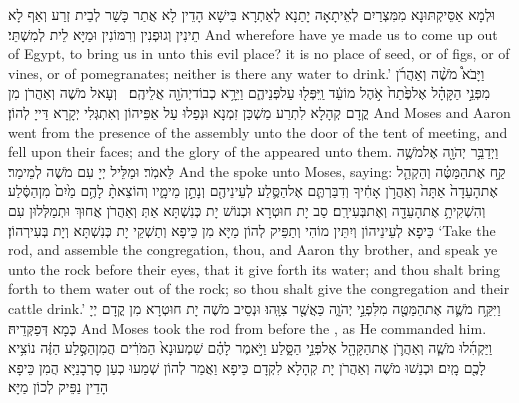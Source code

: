 {וּלְמָא אַסֵּיקְתּוּנָא מִמִּצְרַיִם לְאֵיתָאָה יָתַנָא לְאַתְרָא בִּישָׁא הָדֵין לָא אֲתַר כָּשַׁר לְבֵית זְרַע וְאַף לָא תֵינִין וְגוּפְנִין וְרִמּוֹנִין וּמַיָּא לֵית לְמִשְׁתֵּי׃}
{And wherefore have ye made us to come up out of Egypt, to bring us in unto this evil place? it is no place of seed, or of figs, or of vines, or of pomegranates; neither is there any water to drink.’}{}
{וַיָּבֹא֩ מֹשֶׁ֨ה וְאַהֲרֹ֜ן מִפְּנֵ֣י הַקָּהָ֗ל אֶל\maqqaf פֶּ֙תַח֙ אֹ֣הֶל מוֹעֵ֔ד וַֽיִּפְּל֖וּ עַל\maqqaf פְּנֵיהֶ֑ם וַיֵּרָ֥א כְבוֹד\maqqaf יְהֹוָ֖ה אֲלֵיהֶֽם׃ \petucha }
{וְעָאל מֹשֶׁה וְאַהֲרֹן מִן קֳדָם קְהָלָא לִתְרַע מַשְׁכַּן זִמְנָא וּנְפַלוּ עַל אַפֵּיהוֹן וְאִתְגְּלִי יְקָרָא דַּייָ לְהוֹן׃}
{And Moses and Aaron went from the presence of the assembly unto the door of the tent of meeting, and fell upon their faces; and the glory of the \lord\space appeared unto them.}{}
{וַיְדַבֵּ֥ר יְהֹוָ֖ה אֶל\maqqaf מֹשֶׁ֥ה לֵּאמֹֽר׃}
{וּמַלֵּיל יְיָ עִם מֹשֶׁה לְמֵימַר׃}
{And the \lord\space spoke unto Moses, saying:}{}
{קַ֣ח אֶת\maqqaf הַמַּטֶּ֗ה וְהַקְהֵ֤ל אֶת\maqqaf הָעֵדָה֙ אַתָּה֙ וְאַהֲרֹ֣ן אָחִ֔יךָ וְדִבַּרְתֶּ֧ם אֶל\maqqaf הַסֶּ֛לַע לְעֵינֵיהֶ֖ם וְנָתַ֣ן מֵימָ֑יו וְהוֹצֵאתָ֨ לָהֶ֥ם מַ֙יִם֙ מִן\maqqaf הַסֶּ֔לַע וְהִשְׁקִיתָ֥ אֶת\maqqaf הָעֵדָ֖ה וְאֶת\maqqaf בְּעִירָֽם׃}
{סַב יָת חוּטְרָא וּכְנוֹשׁ יָת כְּנִשְׁתָּא אַתְּ וְאַהֲרֹן אֲחוּךְ וּתְמַלְּלוּן עִם כֵּיפָא לְעֵינֵיהוֹן וְיִתֵּין מוֹהִי וְתַפֵּיק לְהוֹן מַיָּא מִן כֵּיפָא וְתַשְׁקֵי יָת כְּנִשְׁתָּא וְיָת בְּעִירְהוֹן׃}
{‘Take the rod, and assemble the congregation, thou, and Aaron thy brother, and speak ye unto the rock before their eyes, that it give forth its water; and thou shalt bring forth to them water out of the rock; so thou shalt give the congregation and their cattle drink.’}{}
{וַיִּקַּ֥ח מֹשֶׁ֛ה אֶת\maqqaf הַמַּטֶּ֖ה מִלִּפְנֵ֣י יְהֹוָ֑ה כַּאֲשֶׁ֖ר צִוָּֽהוּ׃}
{וּנְסֵיב מֹשֶׁה יָת חוּטְרָא מִן קֳדָם יְיָ כְּמָא דְּפַקְּדֵיהּ׃}
{And Moses took the rod from before the \lord, as He commanded him.}{}
{וַיַּקְהִ֜לוּ מֹשֶׁ֧ה וְאַהֲרֹ֛ן אֶת\maqqaf הַקָּהָ֖ל אֶל\maqqaf פְּנֵ֣י הַסָּ֑לַע וַיֹּ֣אמֶר לָהֶ֗ם שִׁמְעוּ\maqqaf נָא֙ הַמֹּרִ֔ים הֲמִן\maqqaf הַסֶּ֣לַע הַזֶּ֔ה נוֹצִ֥יא לָכֶ֖ם מָֽיִם׃}
{וּכְנַשׁוּ מֹשֶׁה וְאַהֲרֹן יָת קְהָלָא לִקְדָם כֵּיפָא וַאֲמַר לְהוֹן שְׁמַעוּ כְעַן סָרְבָנַיָּא הֲמִן כֵּיפָא הָדֵין נַפֵּיק לְכוֹן מַיָּא׃}
